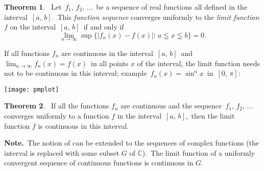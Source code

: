 \documentclass[12pt]{article}
\theoremstyle{definition}
\newtheorem{thmplain}{Theorem}
\begin{document}
\begin{thmplain}
 \, Let\, $f_1,\,f_2,\,\ldots$\, be a sequence of real functions all defined in the interval\, $[a,\,b]$.\, This {\em function sequence} converges uniformly to the {\em limit function} $f$ on the interval\, $[a,\,b]$\, if and only if
$$\lim_{n\to\infty}\sup\{|f_n(x)-f(x)|\vdots \,\, a \leqq x \leqq b\} = 0.$$
\end{thmplain}

If all functions $f_n$ are continuous in the interval\, $[a,\,b]$\, and\, $\lim_{n\to\infty}f_n(x) = f(x)$\, in all points $x$ of the interval, the limit function needs not to be continuous in this interval; example\, $f_n(x) = \sin^{n}x$\, in\, $[0,\,\pi]$:
\begin{center}
\texttt{[image: pmplot]}
\end{center}

\begin{thmplain}
 \, If all the functions $f_n$ are continuous and the sequence \,$f_1,\,f_2,\,\ldots$\, converges uniformly to a function $f$ in the interval\, $[a,\,b]$,\, then the limit function $f$ is continuous in this interval.
\end{thmplain}

\textbf{Note.} \,The notion of  can be extended to the sequences of complex functions (the interval is replaced with some subset $G$ of $\mathbb{C}$).\, The limit function of a uniformly convergent sequence of continuous functions is continuous in $G$.
\end{document}
